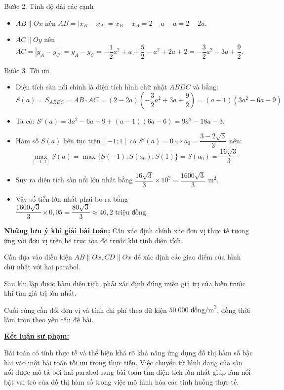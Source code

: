 \documentclass[12pt,a4paper,oneside]{book}
\theoremstyle{theorem}
\theoremstyle{definition}
\begin{document}
Bước 2. Tính độ dài các cạnh
\begin{itemize}
    \item $AB \parallel Ox$ nên $AB = |x_B - x_A| = x_B - x_A = 2 - a - a = 2 - 2a$.
    \item $AC \parallel Oy$ nên $AC = |y_A - y_C| = y_A - y_C = -\dfrac{1}{2}a^2 + a + \dfrac{5}{2} - a^2 + 2a + 2 = -\dfrac{3}{2}a^2 + 3a + \dfrac{9}{2}$.
\end{itemize}

Bước 3. Tối ưu
\begin{itemize}
    \item Diện tích sàn nổi chính là diện tích hình chữ nhật $ABDC$ và bằng:
    $$S(a) = S_{ABDC} = AB \cdot AC = (2 - 2a)\left(-\dfrac{3}{2}a^2 + 3a + \frac{9}{2}\right) = (a - 1)(3a^2 - 6a - 9)$$
    \item Ta có: $S'(a) = 3a^2 - 6a - 9 + (a - 1)(6a - 6) = 9a^2 - 18a - 3$.
    \item Hàm số $S(a)$ liên tục trên $[-1; 1]$ có $S'(a) = 0 \iff a_0 = \dfrac{3 - 2\sqrt{3}}{3}$ nên:
    $$\max_{[-1; 1]} S(a) = \max\{S(-1); S(a_0); S(1)\} = S(a_0) = \dfrac{16\sqrt{3}}{3}$$
    \item Suy ra diện tích sàn nổi lớn nhất bằng $\dfrac{16\sqrt{3}}{3} \times 10^2 = \dfrac{1600\sqrt{3}}{3}\text{ m}^2$.
    \item Vậy số tiền lớn nhất phải bỏ ra bằng $\dfrac{1600\sqrt{3}}{3} \times 0,05 = \dfrac{80\sqrt{3}}{3} \approx 46,2\text{ triệu đồng}$.
\end{itemize}
        \textbf{\underline{Những lưu ý khi giải bài toán:}}
        Cần xác định chính xác đơn vị thực tế tương ứng với đơn vị trên hệ trục tọa độ trước khi tính diện tích.

Cần dựa vào điều kiện $AB \parallel Ox, CD \parallel Ox$ để xác định các giao điểm của hình chữ nhật với hai parabol.

Sau khi lập được hàm diện tích, phải xác định đúng miền giá trị của biến trước khi tìm giá trị lớn nhất.

Cuối cùng cần đổi đơn vị và tính chi phí theo dữ kiện $50.000\text{ đồng/m}^2$, đồng thời làm tròn theo yêu cầu đề bài.

        \textbf{\underline{Kết luận sư phạm:}}

        Bài toán có tính thực tế và thể hiện khá rõ khả năng ứng dụng đồ thị hàm số bậc hai vào một bài toán tối ưu trong thực tiễn. Việc chuyển từ hình dạng của sàn nổi được mô tả bởi hai parabol sang bài toán tìm diện tích lớn nhất giúp làm nổi bật vai trò của đồ thị hàm số trong việc mô hình hóa các tình huống thực tế.
        
\end{document}
